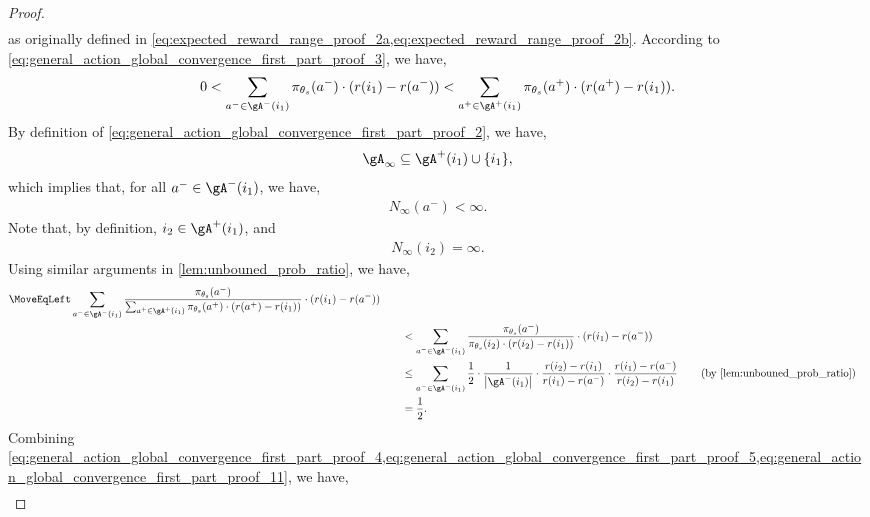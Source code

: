 \begin{proof}
\begin{align}
\end{align}
as originally defined in \cref{eq:expected_reward_range_proof_2a,eq:expected_reward_range_proof_2b}. According to \cref{eq:general_action_global_convergence_first_part_proof_3}, we have,
\begin{align}
\label{eq:general_action_global_convergence_first_part_proof_7}
     0 < \sum_{a^- \in \gA^-(i_1)}{ \pi_{\theta_s}(a^-) \cdot ( r(i_1) - r(a^-)) } < \sum_{a^+ \in \gA^+(i_1)}{ \pi_{\theta_s}(a^+) \cdot (r(a^+) - r(i_1) ) }.
\end{align}
By definition of  \cref{eq:general_action_global_convergence_first_part_proof_2}, we have,
\begin{align}
\label{eq:general_action_global_convergence_first_part_proof_8}
    \gA_\infty \subseteq \gA^+(i_1) \cup \{ i_1 \},
\end{align}
which implies that, for all $a^- \in \gA^-(i_1)$, we have,
\begin{align}
\label{eq:general_action_global_convergence_first_part_proof_9}
    N_\infty(a^-) < \infty.
\end{align}
Note that, by definition, $i_2 \in \gA^+(i_1)$, and 
\begin{align}
\label{eq:general_action_global_convergence_first_part_proof_10}
    N_\infty(i_2) = \infty.
\end{align}
Using similar arguments in \cref{lem:unbouned_prob_ratio}, we have,
\begin{align}
\label{eq:general_action_global_convergence_first_part_proof_11}
\MoveEqLeft
    \sum_{a^- \in \gA^-(i_1)}{ \frac{\pi_{\theta_s}(a^-)}{ \sum_{a^+ \in \gA^+(i_1)}{ \pi_{\theta_s}(a^+) \cdot (r(a^+) - r(i_1) ) } } \cdot ( r(i_1) - r(a^-)) } \\
    &\qquad <  \sum_{a^- \in \gA^-(i_1)}{ \frac{\pi_{\theta_s}(a^-)}{ \pi_{\theta_s}(i_2) \cdot (r(i_2) - r(i_1) ) } \cdot ( r(i_1) - r(a^-)) } \\
    &\qquad \le \sum_{a^- \in \gA^-(i_1)}{ \frac{1}{2} \cdot \frac{1}{\big| \gA^-(i_1) \big|} \cdot \frac{r(i_2) - r(i_1)}{r(i_1) - r(a^-)}  \cdot \frac{r(i_1) - r(a^-)}{r(i_2) - r(i_1)} } \qquad \left( \text{by \cref{lem:unbouned_prob_ratio}} \right) \\
    &\qquad = \frac{1}{2}.
\end{align}
Combining \cref{eq:general_action_global_convergence_first_part_proof_4,eq:general_action_global_convergence_first_part_proof_5,eq:general_action_global_convergence_first_part_proof_11}, we have,
\begin{align}

\end{align}
\end{proof}
